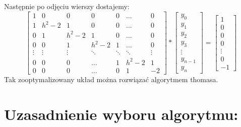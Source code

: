 \documentclass[12pt]{article}
\begin{document}
Następnie po odjęciu wierszy dostajemy: 
\[
\begin{bmatrix}
    1 & 0 & 0 & 0 & 0 & \dots & 0\\
    1 & h^{2}-2 & 1 & 0 & 0 & \dots & 0\\ 
    0 & 1 & h^{2}-2 & 1 & 0 & \dots & 0\\
    0 & 0 & 1 & h^{2}-2 & 1 &\dots & 0\\
    \vdots & \vdots & \vdots & \ddots & \ddots & \ddots & \vdots\\
    0 & 0 & 0 & \hdots & 1 & h^{2}-2 & 1\\
    0 & 0 & 0 & \hdots & 0 & 1 & -2
\end{bmatrix}
*
\begin{bmatrix}
    y_{0}\\
    y_{1}\\
    y_{2}\\
    y_{3}\\
    \vdots\\
    y_{n-1}\\
    y_{n}
\end{bmatrix}
=
\begin{bmatrix}
    1\\
    0\\
    0\\
    0\\
    \vdots\\
    0\\
    -1
\end{bmatrix}
\]
Tak zooptymalizowany układ można rozwiązać algorytmem thomasa.

\section{Uzasadnienie wyboru algorytmu:}
\end{document}
